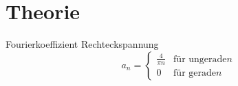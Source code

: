 \section{Theorie}
\label{sec:Theorie}

\cite{sample}

Fourierkoeffizient Rechteckspannung
\begin{equation}
  a_n =
  \begin{cases}
      \frac{4}{\pi n} & \text{für ungerade} n\\
      0 & \text{für gerade} n
  \end{cases}
\end{equation}
